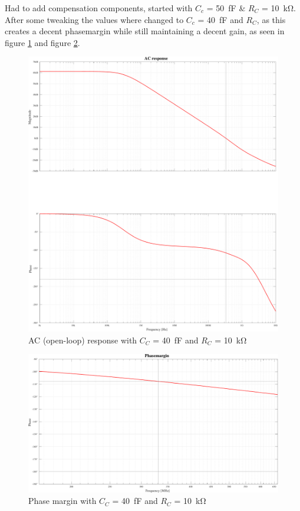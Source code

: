 Had to add compensation components, started with $C_{c}$ = \SI{50}{\femto\farad} \& $R_{C}$ = \SI{10}{\kilo\ohm}. After some tweaking the values where changed to $C_{c}$ = \SI{40}{\femto\farad} and $R_{C}$, as this creates a decent phasemargin while still maintaining a decent gain, as seen in figure \ref{fig:AC:sim} and figure \ref{fig:AC:sim:z:phase}.
\newpage
\null
\vfill
\begin{figure}[H]
    \centering
    \includegraphics[width=.9\linewidth]{Images/Simulations/ac_response.pdf}
    \caption{AC (open-loop) response with $C_{C}$ = \SI{40}{\femto\farad} and $R_{C}$ = \SI{10}{\kilo\ohm}}
    \label{fig:AC:sim}
\end{figure}

\vfill
\newpage
\null
\vfill
\begin{figure}[H]
    \centering
    \includegraphics[width=.87\linewidth]{Images/Simulations/zoomed_phase_margin.pdf}
    \caption{Phase margin with $C_{C}$ = \SI{40}{\femto\farad} and $R_{C}$ = \SI{10}{\kilo\ohm}}
    \label{fig:AC:sim:z:phase}
\end{figure}
\vfill

